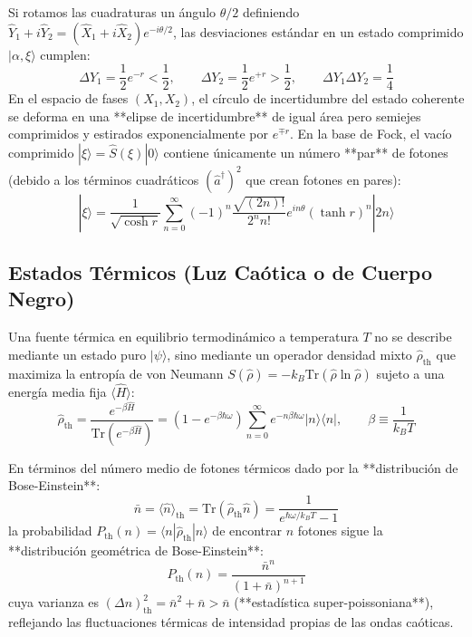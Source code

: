 \documentclass[11pt,a4paper]{book}
\begin{document}
Si rotamos las cuadraturas un ángulo $\theta/2$ definiendo $\hat{Y}_1 + i\hat{Y}_2 = (\hat{X}_1 + i\hat{X}_2)e^{-i\theta/2}$, las desviaciones estándar en un estado comprimido $|\alpha, \xi\rangle$ cumplen:
\begin{equation}
\Delta Y_1 = \frac{1}{2} e^{-r} < \frac{1}{2}, \qquad \Delta Y_2 = \frac{1}{2} e^{+r} > \frac{1}{2}, \qquad \Delta Y_1 \Delta Y_2 = \frac{1}{4}
\end{equation}
En el espacio de fases $(X_1, X_2)$, el círculo de incertidumbre del estado coherente se deforma en una **elipse de incertidumbre** de igual área pero semiejes comprimidos y estirados exponencialmente por $e^{\mp r}$. En la base de Fock, el vacío comprimido $|\xi\rangle = \hat{S}(\xi)|0\rangle$ contiene únicamente un número **par** de fotones (debido a los términos cuadráticos $(\hat{a}^\dagger)^2$ que crean fotones en pares):
\begin{equation}
|\xi\rangle = \frac{1}{\sqrt{\cosh r}} \sum_{n=0}^{\infty} (-1)^n \frac{\sqrt{(2n)!}}{2^n n!} e^{in\theta} (\tanh r)^n |2n\rangle
\end{equation}

\subsection{Estados Térmicos (Luz Caótica o de Cuerpo Negro)}

Una fuente térmica en equilibrio termodinámico a temperatura $T$ no se describe mediante un estado puro $|\psi\rangle$, sino mediante un operador densidad mixto $\hat{\rho}_{\text{th}}$ que maximiza la entropía de von Neumann $S(\hat{\rho}) = -k_B \text{Tr}(\hat{\rho}\ln\hat{\rho})$ sujeto a una energía media fija $\langle \hat{H} \rangle$:
\begin{equation}
\hat{\rho}_{\text{th}} = \frac{e^{-\beta \hat{H}}}{\text{Tr}\left(e^{-\beta \hat{H}}\right)} = \left(1 - e^{-\beta\hbar\omega}\right) \sum_{n=0}^{\infty} e^{-n\beta\hbar\omega} |n\rangle\langle n|, \qquad \beta \equiv \frac{1}{k_B T}
\end{equation}

En términos del número medio de fotones térmicos dado por la **distribución de Bose-Einstein**:
\begin{equation}
\bar{n} = \langle \hat{n} \rangle_{\text{th}} = \text{Tr}(\hat{\rho}_{\text{th}} \hat{n}) = \frac{1}{e^{\hbar\omega / k_B T} - 1}
\end{equation}
la probabilidad $P_{\text{th}}(n) = \langle n | \hat{\rho}_{\text{th}} | n \rangle$ de encontrar $n$ fotones sigue la **distribución geométrica de Bose-Einstein**:
\begin{equation}
P_{\text{th}}(n) = \frac{\bar{n}^n}{(1 + \bar{n})^{n+1}}
\end{equation}
cuya varianza es $(\Delta n)^2_{\text{th}} = \bar{n}^2 + \bar{n} > \bar{n}$ (**estadística super-poissoniana**), reflejando las fluctuaciones térmicas de intensidad propias de las ondas caóticas.
\end{document}
